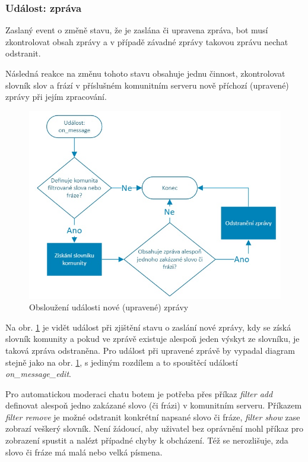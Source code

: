 \documentclass[
  program=inf,
biblatex=false,
sourcecodes=true,
joinlists=true,
  figures=true,
  tables=true,
  glossaries=true,
  index=false
]{kidiplom}
\begin{document}
\subsubsection{Událost: zpráva}
Zaslaný event o změně stavu, že je zaslána či upravena zpráva, bot musí zkontrolovat 
obsah zprávy a v případě závadné zprávy takovou zprávu nechat odstranit.

Následná reakce na změnu tohoto stavu obsahuje jednu činnost, zkontrolovat slovník slov a frází
v příslušném komunitním serveru nově příchozí (upravené) zprávy při jejím zpracování.
\begin{figure}[h]
  \centering \includegraphics[scale=1]{on_message}
  \caption{\label{message}Obsloužení události nové (upravené) zprávy}
\end{figure}

Na obr. \ref{message} je vidět událost při zjištění stavu o zaslání nové zprávy, kdy se získá 
 slovník komunity a pokud ve zprávě existuje alespoň jeden výskyt ze slovníku, je taková zpráva odstraněna.
Pro událost při upravené zprávě by vypadal diagram stejně jako na obr. \ref{message}, s jediným rozdílem
a to spouštěcí událostí {\it on\_message\_edit}.

Pro automatickou moderaci chatu botem je potřeba přes příkaz {\it filter add} definovat alespoň jedno zakázané slovo (či frázi)
v komunitním serveru. Příkazem {\it filter remove} je možné odstranit konkrétní napsané slovo či fráze, {\it filter show} zase 
zobrazí veškerý slovník. Není žádoucí, aby uživatel bez oprávnění mohl příkaz pro zobrazení spustit a nalézt případné chyby
k obcházení. Též se nerozlišuje, zda slovo či fráze má malá nebo velká písmena.
\end{document}
